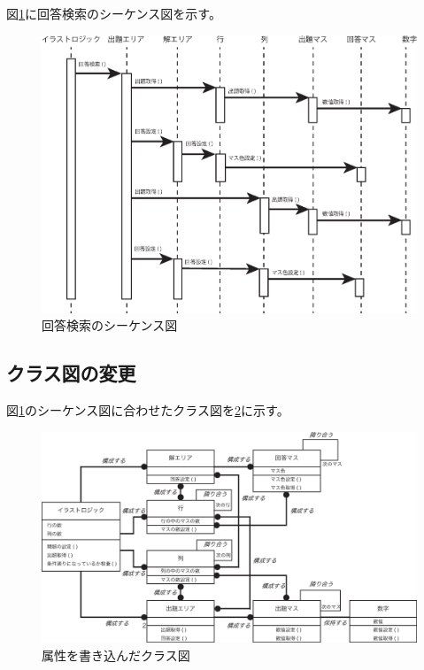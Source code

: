 \documentclass[a4j]{jarticle}
\begin{document}
図\ref{fig:sequence-diagram}に回答検索のシーケンス図を示す。

\begin{figure}[hp]
\centering
\includegraphics[width=15cm]{./image/sequence-diagram.eps}
\caption{回答検索のシーケンス図}
\label{fig:sequence-diagram}
\end{figure}

\subsection{クラス図の変更}
図\ref{fig:sequence-diagram}のシーケンス図に合わせたクラス図を\ref{fig:class-sequence}に示す。

\begin{figure}[hp]
\centering
\includegraphics[width=15cm]{./image/class-sequence.eps}
\caption{属性を書き込んだクラス図}
\label{fig:class-sequence}
\end{figure}
\end{document}
